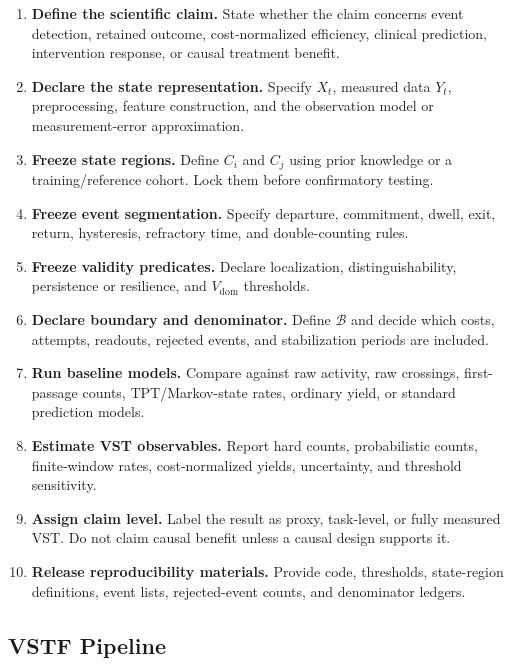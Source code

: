 \documentclass[11pt,a4paper]{article}
\newcommand{\1}{\mathbf{1}}
\begin{document}
\begin{enumerate}
  \item \textbf{Define the scientific claim.} State whether the claim concerns event detection, retained outcome, cost-normalized efficiency, clinical prediction, intervention response, or causal treatment benefit.
  \item \textbf{Declare the state representation.} Specify $X_t$, measured data $Y_t$, preprocessing, feature construction, and the observation model or measurement-error approximation.
  \item \textbf{Freeze state regions.} Define $C_i$ and $C_j$ using prior knowledge or a training/reference cohort. Lock them before confirmatory testing.
  \item \textbf{Freeze event segmentation.} Specify departure, commitment, dwell, exit, return, hysteresis, refractory time, and double-counting rules.
  \item \textbf{Freeze validity predicates.} Declare localization, distinguishability, persistence or resilience, and $V_{\mathrm{dom}}$ thresholds.
  \item \textbf{Declare boundary and denominator.} Define $\mathcal{B}$ and decide which costs, attempts, readouts, rejected events, and stabilization periods are included.
  \item \textbf{Run baseline models.} Compare against raw activity, raw crossings, first-passage counts, TPT/Markov-state rates, ordinary yield, or standard prediction models.
  \item \textbf{Estimate VST observables.} Report hard counts, probabilistic counts, finite-window rates, cost-normalized yields, uncertainty, and threshold sensitivity.
  \item \textbf{Assign claim level.} Label the result as proxy, task-level, or fully measured VST. Do not claim causal benefit unless a causal design supports it.
  \item \textbf{Release reproducibility materials.} Provide code, thresholds, state-region definitions, event lists, rejected-event counts, and denominator ledgers.
\end{enumerate}

\subsection{VSTF Pipeline}
\end{document}
